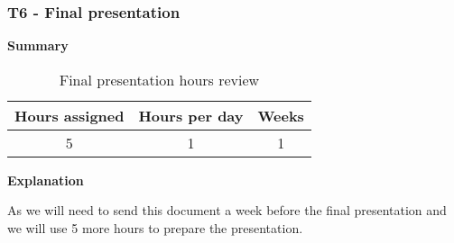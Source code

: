 \subsubsection{T6 - Final presentation}
\label{sssec:finalPresent}

\textbf{Summary}
\begin{table}[ht]
\centering
  \begin{tabular}{| c | c | c |}
  \hline Hours assigned & Hours per day & Weeks \\ \hline  
   5 & 1 & 1        \\ \hline
  \end{tabular}
  \caption{Final presentation hours review} \vspace{3pt}
  \label{tab:finalPresent}
\end{table}

\textbf{Explanation}

As we will need to send this document a week before the final presentation and we will use 5 more hours to prepare the presentation.
